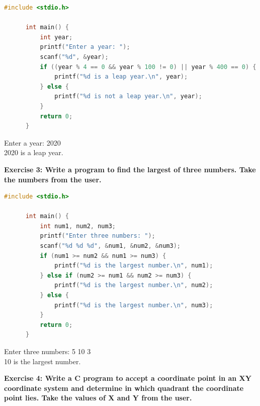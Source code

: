 \documentclass[12pt, openany]{book}
\begin{document}
  \begin{lstlisting}[language=C, caption=Solution to Exercise 2]
      #include <stdio.h>
      
      int main() {
          int year;
          printf("Enter a year: ");
          scanf("%d", &year);
          if ((year % 4 == 0 && year % 100 != 0) || year % 400 == 0) {
              printf("%d is a leap year.\n", year);
          } else {
              printf("%d is not a leap year.\n", year);
          }
          return 0;
      }
  \end{lstlisting}
  \begin{tcolorbox}[colback=lightgray!10, colframe=black, title=Output]
      Enter a year: 2020 \\
      2020 is a leap year.
  \end{tcolorbox}
  \vspace{10pt}
  \noindent\textbf{Exercise 3: Write a program to find the largest of three numbers. Take the numbers from the user.}
  
  \begin{lstlisting}[language=C, caption=Solution to Exercise 3]
      #include <stdio.h>
      
      int main() {
          int num1, num2, num3;
          printf("Enter three numbers: ");
          scanf("%d %d %d", &num1, &num2, &num3);
          if (num1 >= num2 && num1 >= num3) {
              printf("%d is the largest number.\n", num1);
          } else if (num2 >= num1 && num2 >= num3) {
              printf("%d is the largest number.\n", num2);
          } else {
              printf("%d is the largest number.\n", num3);
          }
          return 0;
      }
  \end{lstlisting}
  \begin{tcolorbox}[colback=lightgray!10, colframe=black, title=Output]
      Enter three numbers: 5 10 3 \\
      10 is the largest number.
  \end{tcolorbox}
  \noindent\textbf{Exercise 4: Write a C program to accept a coordinate point in an XY coordinate system and determine in which quadrant the coordinate point lies. Take the values of X and Y from the user.}
  
\end{document}
